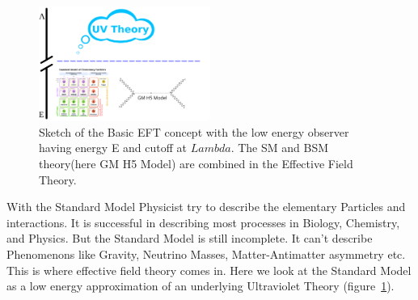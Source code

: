 \documentclass[../Bachelorarbeit.tex]{subfiles}
\begin{document}
\label{sec:EFT}

\begin{figure}[h]
    \centering
    \includegraphics[width=0.5\textwidth]{images/EFT_Model.png}
    \caption{Sketch of the Basic EFT concept with the low energy observer having energy E and cutoff at $Lambda$. The SM and BSM theory(here GM H5 Model) are combined in the Effective Field Theory. \cite{Brivio.2017}}
    \label{fig:EFT_sketch}
\end{figure}

With the Standard Model Physicist try to describe the elementary Particles and interactions. It is successful in describing most processes in Biology, Chemistry, and Physics.
But the Standard Model is still incomplete. It can't describe Phenomenons like Gravity, Neutrino Masses, Matter-Antimatter asymmetry etc. This is where effective field theory comes in.
Here we look at the Standard Model as a low energy approximation of an underlying Ultraviolet Theory (figure~\ref{fig:EFT_sketch}).

\end{document}
